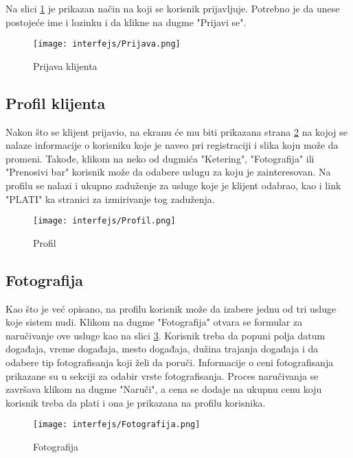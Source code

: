 \documentclass[a4paper]{article}
\begin{document}
Na slici \ref{fig:ki_prijava} je prikazan način na koji se korisnik prijavljuje. Potrebno je da unese postojeće ime i lozinku i da klikne na dugme "Prijavi se".

\begin{figure}[H]
    \centering
    \texttt{[image: interfejs/Prijava.png]}
    \caption{Prijava klijenta}
    \label{fig:ki_prijava}
\end{figure}

\subsection{Profil klijenta}

Nakon što se klijent prijavio, na ekranu će mu biti prikazana strana \ref{fig:ki_profil} na kojoj se nalaze informacije o korisniku koje je naveo pri registraciji i slika koju može da promeni. Takođe, klikom na neko od dugmića "Ketering", "Fotografija" ili "Prenosivi bar" korisnik može da odabere uslugu za koju je zainteresovan. Na profilu se nalazi i ukupno zaduženje za usluge koje je klijent odabrao, kao i link "PLATI" ka stranici za izmirivanje tog zaduženja.


\begin{figure}[H]
    \centering
    \texttt{[image: interfejs/Profil.png]}
    \caption{Profil}
    \label{fig:ki_profil}
\end{figure}

\subsection{Fotografija}

Kao što je već opisano, na profilu korisnik može da izabere jednu od tri usluge koje sistem nudi. Klikom na dugme "Fotografija" otvara se formular za naručivanje ove usluge kao na slici \ref{fig:ki_fotografija}. Korisnik treba da popuni polja datum događaja, vreme događaja, mesto događaja, dužina trajanja događaja i da odabere tip fotografisanja koji želi da poruči. Informacije o ceni fotografisanja prikazane su u sekciji za odabir vrste fotografisanja. Proces naručivanja se završava klikom na dugme "Naruči", a cena se dodaje na ukupnu cenu koju korisnik treba da plati i ona je prikazana na profilu korisnika. 

\begin{figure}[H]
    \centering
    \texttt{[image: interfejs/Fotografija.png]}
    \caption{Fotografija}
    \label{fig:ki_fotografija}
\end{figure}
\end{document}
